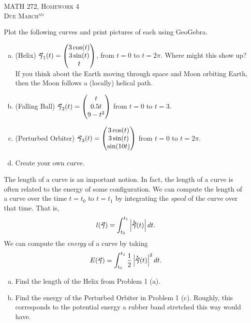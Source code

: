 \documentclass[12pt]{article} %
\begin{document}
\begin{center}
   \textsc{\large MATH 272, Homework 4}\\
   \textsc{Due March$^\textrm{nd}$}
\end{center}
\vspace{.5cm}

\begin{problem}
Plot the following curves and print pictures of each using GeoGebra.  
\begin{enumerate}[(a)]
	\item (Helix) $\boldsymbol{\vec{\gamma}}_1(t) = \begin{pmatrix} 3\cos(t) \\ 3\sin(t) \\ t\end{pmatrix}$, from $t=0$ to $t=2\pi$. Where might this show up? If you think about the Earth moving through space and Moon orbiting Earth, then the Moon follows a (locally) helical path.
	
	\item (Falling Ball) $\boldsymbol{\vec{\gamma}}_2(t) = \begin{pmatrix} t\\  0.5t \\ 9-t^2 \end{pmatrix}$ from $t=0$ to $t=3$.
	
	\item (Perturbed Orbiter) $\boldsymbol{\vec{\gamma}}_3(t) = \begin{pmatrix} 3\cos(t) \\ 3 \sin(t) \\ \sin(10t)\end{pmatrix}$ from $t=0$ to $t=2\pi$.
	
	\item Create your own curve.
\end{enumerate}
\end{problem}

\begin{problem}
The length of a curve is an important notion. In fact, the length of a curve is often related to the energy of some configuration. We can compute the length of a curve over the time $t=t_0$ to $t=t_1$ by integrating the \emph{speed} of the curve over that time.  That is,
\[
l(\boldsymbol{\vec{\gamma}}) = \int_{t_0}^{t_1} \left|\boldsymbol{\dot{\vec{\gamma}}}(t)\right| dt.
\]
We can compute the \emph{energy} of a curve by taking
\[
E(\boldsymbol{\vec{\gamma}}) = \int_{t_0}^{t_1} \frac{1}{2} \left| \boldsymbol{\dot{\vec{\gamma}}}(t)\right|^2dt.
\]
\begin{enumerate}[(a)]
	\item Find the length of the Helix from Problem 1 (a).
	\item Find the energy of the Perturbed Orbiter in Problem 1 (c).  Roughly, this corresponds to the potential energy a rubber band stretched this way would have.
\end{enumerate}
\end{problem}
\end{document}
